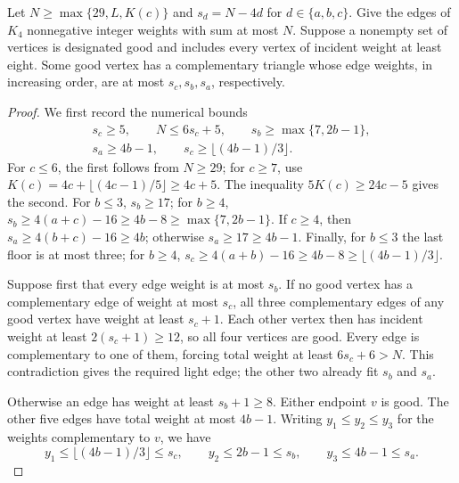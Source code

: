 \begin{lemma}\label{lem:weighted-triangle}
Let $N\ge\max\{29,L,K(c)\}$ and $s_d=N-4d$ for $d\in\{a,b,c\}$.
Give the edges of $K_4$ nonnegative integer weights with sum at most $N$.
Suppose a nonempty set of vertices is designated good and includes every
vertex of incident weight at least eight. Some good vertex has a
complementary triangle whose edge weights, in increasing order, are at
most $s_c,s_b,s_a$, respectively.
\end{lemma}
\begin{proof}
We first record the numerical bounds
\begin{equation}\label{eq:cuboid-slack}
\begin{gathered}
 s_c\ge5,\qquad N\le6s_c+5,\qquad
 s_b\ge\max\{7,2b-1\},\\
 s_a\ge4b-1,\qquad s_c\ge\lfloor(4b-1)/3\rfloor.
\end{gathered}
\end{equation}
For $c\le6$, the first follows from $N\ge29$; for $c\ge7$, use
$K(c)=4c+\lfloor(4c-1)/5\rfloor\ge4c+5$.
The inequality $5K(c)\ge24c-5$ gives the second.
For $b\le3$, $s_b\ge17$; for $b\ge4$,
$s_b\ge4(a+c)-16\ge4b-8\ge\max\{7,2b-1\}$.
If $c\ge4$, then $s_a\ge4(b+c)-16\ge4b$; otherwise
$s_a\ge17\ge4b-1$.
Finally, for $b\le3$ the last floor is at most three; for $b\ge4$,
$s_c\ge4(a+b)-16\ge4b-8\ge\lfloor(4b-1)/3\rfloor$.

Suppose first that every edge weight is at most $s_b$. If no good vertex
has a complementary edge of weight at most $s_c$, all three complementary
edges of any good vertex have weight at least $s_c+1$. Each other vertex
then has incident weight at least $2(s_c+1)\ge12$, so all four vertices
are good. Every edge is complementary to one of them, forcing total
weight at least $6s_c+6>N$. This contradiction gives the required light
edge; the other two already fit $s_b$ and $s_a$.

Otherwise an edge has weight at least $s_b+1\ge8$. Either endpoint $v$
is good. The other five edges have total weight at most $4b-1$.
Writing $y_1\le y_2\le y_3$ for the weights complementary to $v$, we have
\[
 y_1\le\lfloor(4b-1)/3\rfloor\le s_c,\qquad
 y_2\le2b-1\le s_b,\qquad y_3\le4b-1\le s_a.
\]
\end{proof}

